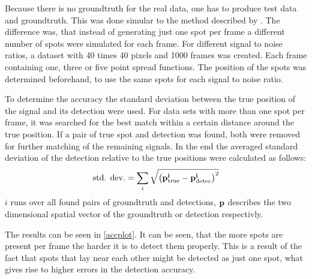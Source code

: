 Because there is no groundtruth for the real data, one has to produce test data and groundtruth. This was done simular to the method described by \cite{simulated}. The difference was, that instead of generating just one spot per frame a different number of spots were simulated for each frame. For different signal to  noise ratios, a dataset with 40 times 40 pixels and 1000 frames was created. Each frame containing one, three or five point spread functions. The position of the spots was determined beforehand, to use the same spots for each signal to noise ratio.\newline

To determine the accuracy the standard deviation between the true position of the signal and its detection were used. For data sets with more than one spot per frame, it was searched for the best match within a certain distance around the true position. If a pair of true spot and detection was found, both were removed for further matching of the remaining signals. In the end the averaged standard deviation of the detection relative to the true positions were calculated as follows:
\begin{align}
	\text{std. dev.} = \sum_i \sqrt{\left(\bf{p}_{\text{true}}^i - \bf{p}_{\text{detec}}^i\right)^2}
\end{align}
$i$ runs over all found pairs of groundtruth and detections, $\bf{p}$ describes the two dimensional spatial vector of the groundtruth or detection respectivly.\newline

The results can be seen in \ref{accplot}. It can be seen, that the more spots are present per frame the harder it is to detect them properly. This is a result of the fact that spots that lay near each other might be detected as just one spot, what gives rise to higher errors in the detection accuracy.


